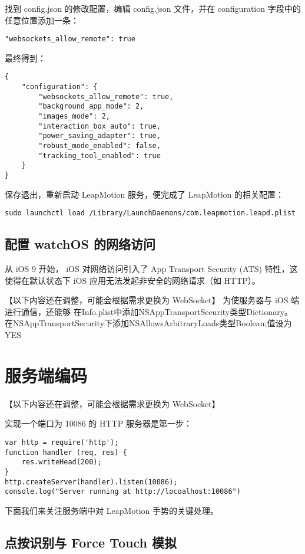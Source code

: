 找到 config.json 的修改配置，编辑 config.json 文件，并在 configuration 字段中的任意位置添加一条：
\begin{lstlisting}
"websockets_allow_remote": true
\end{lstlisting}

最终得到：

\begin{lstlisting}
{
    "configuration": {
        "websockets_allow_remote": true,
        "background_app_mode": 2,
        "images_mode": 2,
        "interaction_box_auto": true,
        "power_saving_adapter": true,
        "robust_mode_enabled": false,
        "tracking_tool_enabled": true
    }
}
\end{lstlisting}

保存退出，重新启动 LeapMotion 服务，便完成了 LeapMotion 的相关配置：

\begin{lstlisting}
sudo launchctl load /Library/LaunchDaemons/com.leapmotion.leapd.plist
\end{lstlisting}

\subsection{配置 watchOS 的网络访问}

从 iOS 9 开始， iOS 对网络访问引入了 App Transport Security (ATS) 特性，这使得在默认状态下 iOS 应用无法发起非安全的网络请求（如 HTTP）。

【以下内容还在调整，可能会根据需求更换为 WebSocket】
为使服务器与 iOS 端进行通信，还能够
在Info.plist中添加NSAppTransportSecurity类型Dictionary。
在NSAppTransportSecurity下添加NSAllowsArbitraryLoads类型Boolean,值设为YES

\section{服务端编码}

【以下内容还在调整，可能会根据需求更换为 WebSocket】

实现一个端口为 10086 的 HTTP 服务器是第一步：
\begin{lstlisting}
var http = require('http');
function handler (req, res) {
    res.writeHead(200);
}
http.createServer(handler).listen(10086);
console.log("Server running at http://locoalhost:10086")
\end{lstlisting}

下面我们来关注服务端中对 LeapMotion 手势的关键处理。

\subsection{点按识别与 Force Touch 模拟}

